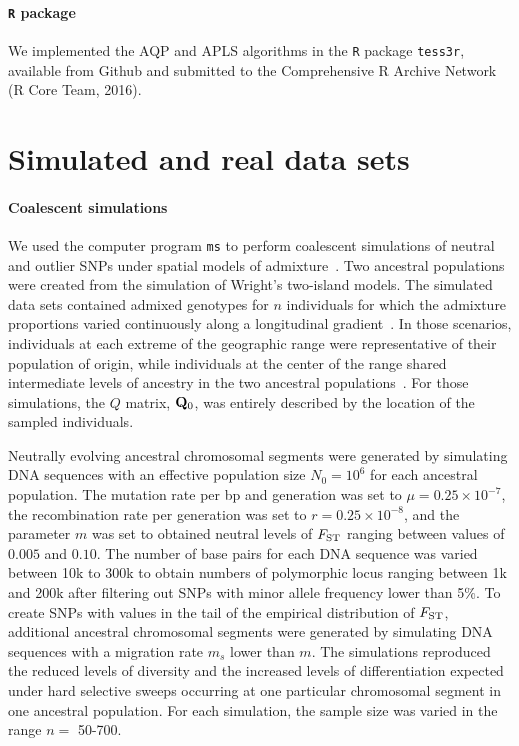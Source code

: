 \paragraph{{\tt R} package} We implemented the AQP and APLS algorithms in the {\tt R} package {\tt tess3r}, available from Github and submitted to the Comprehensive R Archive Network (R Core Team, 2016).  


\section{Simulated and real data sets}
\paragraph{Coalescent simulations} We used the computer program {\tt ms} to perform coalescent simulations of neutral and outlier SNPs under spatial models of admixture~\citep{Hudson2002}. Two ancestral populations were created from the simulation of Wright\rq{}s two-island models. The simulated data sets contained admixed genotypes for $n$ individuals for which the admixture proportions varied continuously along a longitudinal gradient~\citep{Durand2009, Francois2010}. In those scenarios, individuals at each extreme of the geographic range were representative of their population of origin, while individuals at the center of the range shared intermediate levels of ancestry in the two ancestral populations~\citep{Caye2016}. For those simulations, the $Q$ matrix, ${\bf Q}_0$, was entirely described by the location of the sampled individuals.


Neutrally evolving ancestral chromosomal segments were generated by simulating DNA sequences with an effective  population size $N_0 = 10^6$ for each ancestral population. The mutation rate per bp and generation was set to $\mu = 0.25 \times 10^{-7}$, the recombination rate per generation was set to $r = 0.25 \times 10^{-8}$, and the parameter $m$ was set to obtained neutral levels of $F_{\rm ST}$ ranging between values of $0.005$ and $0.10$. The number of base pairs for each DNA sequence was varied between 10k to 300k to obtain numbers of polymorphic locus ranging between 1k and 200k after filtering out SNPs with minor allele frequency lower than 5$\%$.  To create SNPs with values in the tail of the empirical distribution of $F_{\rm ST}$,  additional ancestral chromosomal segments were generated by simulating DNA sequences with a migration rate $m_s$ lower than $m$. The simulations reproduced the reduced levels of diversity and the increased levels of differentiation expected under hard selective sweeps occurring at one particular chromosomal segment in one ancestral population.  For each simulation, the sample size  was varied in the range $n =$ 50-700.

